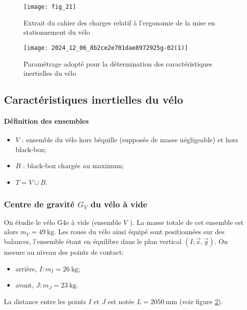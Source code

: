 \begin{figure}[!htb]
\begin{center}
\texttt{[image: fig\_21]}
\caption{Extrait du cahier des charges relatif à l'ergonomie de la mise en stationnement du vélo\\ \label{fig2.1}}
\end{center}
\end{figure}

\begin{figure}[!htb]
\begin{center}
\texttt{[image: 2024\_12\_06\_8b2ce2e701dae8972925g-02(1)]}
\caption{Paramétrage adopté pour la détermination des caractéristiques inertielles du vélo \label{fig2.2}}
\end{center}
\end{figure}


\subsection{Caractéristiques inertielles du vélo}
\paragraph*{Définition des ensembles}
\begin{itemize}
  \item \(V\) : ensemble du vélo hors béquille (supposée de masse négligeable) et hors black-box;
  \item \(B\) : black-box chargée au maximum;
  \item \(T=V \cup B\).
\end{itemize}

\subsubsection{Centre de gravité \(G_{V}\) du vélo à vide}
On étudie le vélo G4e à vide (ensemble \(V\) ). La masse totale de cet ensemble est alors \(m_{V}=49 \mathrm{~kg}\). Les roues du vélo ainsi équipé sont positionnées sur des balances, l'ensemble étant en équilibre dans le plan vertical \((I ; \vec{x}, \vec{y})\). On mesure au niveau des points de contact:
\begin{itemize}
\item arrière, \(I: m_{I}=26 \mathrm{~kg}\);
  \item avant, \(J: m_{J}=23 \mathrm{~kg}\).
\end{itemize}
La distance entre les points \(I\) et \(J\) est notée \(L=2050 \mathrm{~mm}\) (voir figure \ref{fig2.2}).\\


